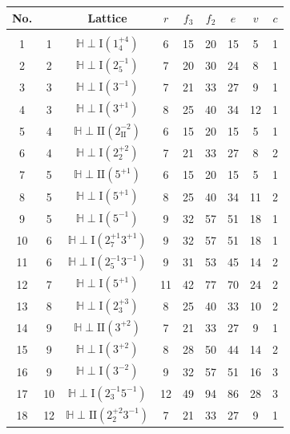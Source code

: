 \documentclass{amsart}
\theoremstyle{definition}
\theoremstyle{remark}
\begin{document}
\setlength{\tabcolsep}{2.5mm} 
\begin{center}
 \begin{longtable}{c|c|c|c|c|c|c|c|c}
  No. & \text{$-\det$} & Lattice & $r$ & $f_3$ & $f_2$ & $e$ & $v$ & $c$ \\
  \hline
   & & & & & & & & \\
   1 & 1  & $\mathbb{H} \perp \mathrm{I}(1_{4}^{+4})$  & 6 & 15 & 20 & 15 & 5 & 1 \\
   2 & 2  & $\mathbb{H} \perp \mathrm{I}(2_{5}^{-1})$  & 7 & 20 & 30 & 24 & 8 & 1 \\
   3 & 3  & $\mathbb{H} \perp \mathrm{I}(3^{-1})$  & 7 & 21 & 33 & 27 & 9 & 1 \\
   4 & 3  & $\mathbb{H} \perp \mathrm{I}(3^{+1})$  & 8 & 25 & 40 & 34 & 12 & 1 \\
   5 & 4  & $\mathbb{H} \perp \mathrm{II}(2_{\mathrm{II}}^{-2})$  & 6 & 15 & 20 & 15 & 5 & 1 \\
   6 &4  & $\mathbb{H} \perp \mathrm{I}(2_{2}^{+2})$  & 7 & 21 & 33 & 27 & 8 & 2 \\
   7 & 5  & $\mathbb{H} \perp \mathrm{II}(5^{+1})$  & 6 & 15 & 20 & 15 & 5 & 1 \\
   8 & 5  & $\mathbb{H} \perp \mathrm{I}(5^{+1})$  & 8 & 25 & 40 & 34 & 11 & 2 \\
   9 & 5  & $\mathbb{H} \perp \mathrm{I}(5^{-1})$  & 9 & 32 & 57 & 51 & 18 & 1 \\
  10 &6  & $\mathbb{H} \perp \mathrm{I}(2_{7}^{+1}3^{+1})$  & 9 & 32 & 57 & 51 & 18 & 1 \\
  11 & 6  & $\mathbb{H} \perp \mathrm{I}(2_{5}^{-1}3^{-1})$  & 9 & 31 & 53 & 45 & 14 & 2 \\
  12 & 7  & $\mathbb{H} \perp \mathrm{I}(5^{+1})$  & 11 & 42 & 77 & 70 & 24 & 2 \\
  13 & 8  & $\mathbb{H} \perp \mathrm{I}(2_{3}^{+3})$  & 8 & 25 & 40 & 33 & 10 & 2 \\
  14 & 9  & $\mathbb{H} \perp \mathrm{II}(3^{+2})$   & 7 & 21 & 33 & 27 & 9 & 1 \\
  15 &  9  & $\mathbb{H} \perp \mathrm{I}(3^{+2})$   & 8 & 28 & 50 & 44 & 14 & 2 \\
  16 &  9  & $\mathbb{H} \perp \mathrm{I}(3^{-2})$   & 9 & 32 & 57 & 51 & 16 & 3 \\
  17 & 10 & $\mathbb{H} \perp \mathrm{I}(2_{3}^{-1}5^{-1})$   & 12 & 49 & 94 & 86 & 28 & 3 \\
  18 &  12 & $\mathbb{H} \perp \mathrm{II}(2_{2}^{+2}3^{-1})$   & 7 & 21 & 33 & 27 & 9 & 1 \\

\end{longtable}
\end{center}
\end{document}
